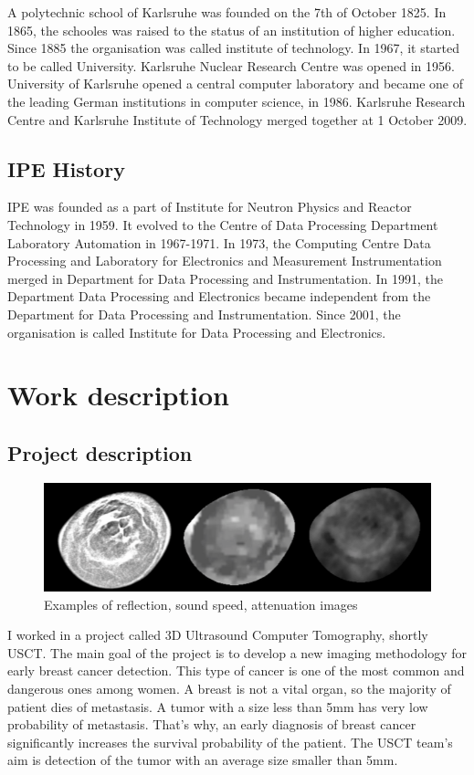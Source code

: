 \documentclass[english]{article}
\begin{document}
A polytechnic school of Karlsruhe was founded on the 7th of October 1825. In 1865, the schooles was raised to the status of an institution of higher education. Since 1885 the organisation was called institute of technology. In 1967, it started to be called University. Karlsruhe Nuclear Research Centre was opened in 1956. \\

University of Karlsruhe opened a central computer laboratory and became one of the leading German institutions in computer science, in 1986. Karlsruhe Research Centre and Karlsruhe Institute of Technology merged together at 1 October 2009.

\subsection{IPE History}

IPE was founded as a part of Institute for Neutron Physics and Reactor Technology in 1959. It evolved to the Centre of Data Processing Department Laboratory Automation in 1967-1971. In 1973, the Computing Centre Data Processing and Laboratory for Electronics and Measurement Instrumentation merged in Department for Data Processing and Instrumentation. In 1991, the Department Data Processing and Electronics became independent from the Department for Data Processing and Instrumentation. Since 2001, the organisation is called Institute for Data Processing and Electronics.

\section{Work description}
\subsection{Project description}
\begin{figure}
\centerline{\includegraphics[scale=0.5]{internship_report/images.png}}
\caption{Examples of reflection, sound speed, attenuation images\label{fig:example}}
\end{figure}
I worked in a project called 3D Ultrasound Computer Tomography, shortly USCT. The main goal of the project is to develop a new imaging methodology for early breast cancer detection. This type of cancer is one of the most common and dangerous ones among women. A breast is not a vital organ, so the majority of patient dies of metastasis. A tumor with a size less than 5mm has very low probability of metastasis.  That's why, an early diagnosis of breast cancer significantly increases the survival probability of the patient. The USCT team's aim is detection of the tumor with an average size smaller than 5mm. 
\end{document}
